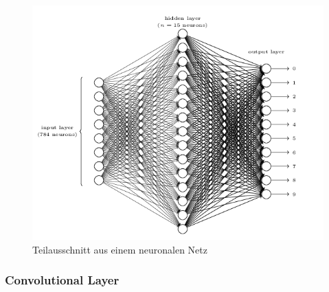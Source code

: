 \documentclass[]{scrartcl}
\begin{document}
			\begin{figure}[h]
				\centering
				\includegraphics[scale=0.7]{img/mnist_net.png}
				\caption{Teilausschnitt aus einem neuronalen Netz \cite{textbook}}
				\label{fig:layer}
			\end{figure}
			
		\subsubsection{Convolutional Layer}
\end{document}
